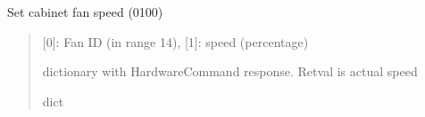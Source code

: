 \documentclass[letterpaper,10pt,english]{sphinxmanual}
\begin{document}
\begin{fulllineitems}
\label{\detokenize{webserverdocs:subrack_hardware.SetFanSpeed}}
\pysigstartsignatures
{}
\pysigstopsignatures
\sphinxAtStartPar
Set cabinet fan speed (0\sphinxhyphen{}100)

\begin{fulllineitems}
\label{\detokenize{webserverdocs:subrack_hardware.SetFanSpeed.do}}
\pysigstartsignatures
{}
\pysigstopsignatures\begin{quote}\begin{description}
\sphinxAtStartPar
{} \textendash{} {[}0{]}: Fan ID (in range 1\sphinxhyphen{}4), {[}1{]}: speed (percentage)

\sphinxAtStartPar
dictionary with HardwareCommand response. Retval is actual speed

\sphinxAtStartPar
dict

\end{description}\end{quote}

\end{fulllineitems}


\end{fulllineitems}

\end{document}
